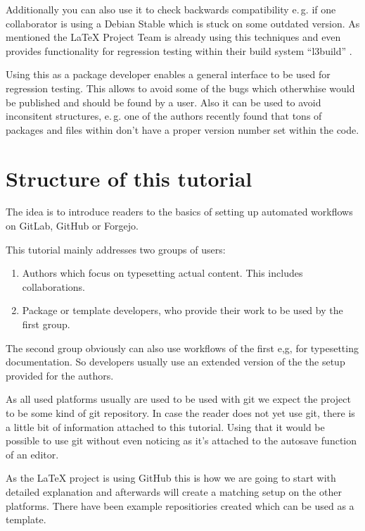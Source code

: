 \documentclass[final]{ltugboat}
\newcommand*{\TeXLive}{\acro{\TeX\,Live}}
\begin{document}
Additionally you can also use it to check backwards compatibility e.\,g. if one collaborator is using a Debian Stable which is stuck on some outdated version.
As mentioned the \LaTeX{} Project Team is already using this techniques and even provides functionality for regression testing within their build system \enquote{l3build} \cite{l3build}.

Using this as a package developer enables a general interface to be used for regression testing.
This allows to avoid some of the bugs which otherwhise would be published and should be found by a user.
Also it can be used to avoid inconsitent structures, e.\,g. one of the authors recently found that tons of packages and files within \TeXLive{} don't have a proper version number set within the code.

\section{Structure of this tutorial}

The idea is to introduce readers to the basics of setting up automated workflows on GitLab, GitHub or Forgejo.

This tutorial mainly addresses two groups of users:

\begin{enumerate}
\item Authors which focus on typesetting actual content. This includes collaborations.
\item Package or template developers, who provide their work to be used by the first group.
\end{enumerate}

The second group obviously can also  use workflows of the first e,g, for typesetting documentation.
So developers usually use an extended version of the the setup provided for the authors.

As all used platforms usually are used to be used with git we expect the project to be some kind of git repository.
In case the reader does not yet use git, there is a little bit of information attached to this tutorial.
Using that it would be possible to use git without even noticing as it's attached to the autosave function of an editor.

As the \LaTeX{} project is using GitHub this is how we are going to start with detailed explanation and afterwards will create a matching setup on the other platforms.
There have been example repositiories created which can be used as a template.
\end{document}
